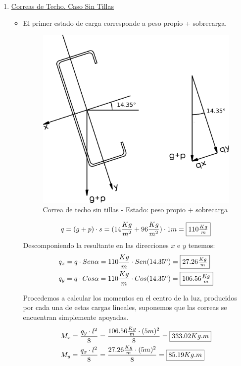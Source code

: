 \newpage
\begin{enumerate}
\item \underline{Correas de Techo. Caso Sin Tillas}\\
\begin{itemize}
\item El primer estado de carga corresponde a peso propio + sobrecarga.

\begin{figure}[H]
\begin{center}
     \includegraphics[scale = 1]{chapters/chapter_3/images/figura1.png}
\caption{Correa de techo sin tillas - Estado: peso propio + sobrecarga}
\end{center}
\end{figure}

$$q= (g+p)\cdot s = (14 \frac{Kg}{m^2}+96 \frac{Kg}{m^2}) \cdot 1m = \framebox{$110 \frac{Kg}{m}$}$$
Descomponiendo la resultante en las direcciones $x$ e $y$ tenemos:
\begin{align*}
& q_x=q \cdot Sen \alpha= 110 \frac{Kg}{m} \cdot Sen(14.35\textsuperscript{o})= \framebox{$27.26 \frac{Kg}{m}$}\\
& q_y=q \cdot Cos \alpha= 110 \frac{Kg}{m} \cdot Cos(14.35\textsuperscript{o})= \framebox{$106.56 \frac{Kg}{m}$}
\end{align*}

Procedemos a calcular los momentos en el centro de la luz, producidos por cada una de estas cargas lineales, suponemos que las correas se encuentran simplemente apoyadas.
\begin{align*}
& M_x= \frac{q_y \cdot l^2}{8} = \frac{106.56 \frac{Kg}{m} \cdot (5m)^2}{8} = \framebox{$333.02 Kg.m$} \\
& M_y= \frac{q_x \cdot l^2}{8} = \frac{27.26 \frac{Kg}{m} \cdot (5m)^2}{8} = \framebox{$85.19 Kg.m$}
\end{align*}


\end{itemize}
\end{enumerate}
